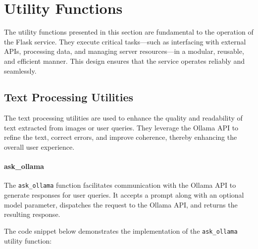 \section{Utility Functions}

The utility functions presented in this section are fundamental to the operation of the Flask service. They execute critical tasks—such as interfacing with external APIs, processing data, and managing server resources—in a modular, reusable, and efficient manner. This design ensures that the service operates reliably and seamlessly.

\subsection{Text Processing Utilities}

The text processing utilities are used to enhance the quality and readability of text extracted from images or user queries. They leverage the Ollama API to refine the text, correct errors, and improve coherence, thereby enhancing the overall user experience.

\paragraph{ask\_ollama}

The \texttt{ask\_ollama} function facilitates communication with the Ollama API to generate responses for user queries. It accepts a prompt along with an optional model parameter, dispatches the request to the Ollama API, and returns the resulting response.

The code snippet below demonstrates the implementation of the \texttt{ask\_ollama} utility function:

